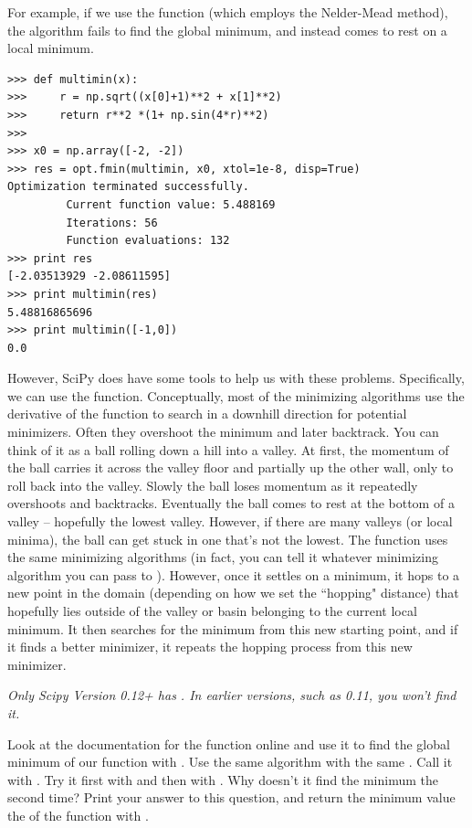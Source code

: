 For example, if we use the  function (which employs the Nelder-Mead method), the algorithm fails to find the global minimum, and instead comes to rest on a local minimum.
\begin{lstlisting}
>>> def multimin(x):
>>>     r = np.sqrt((x[0]+1)**2 + x[1]**2)
>>>     return r**2 *(1+ np.sin(4*r)**2)
>>>
>>> x0 = np.array([-2, -2])
>>> res = opt.fmin(multimin, x0, xtol=1e-8, disp=True)
Optimization terminated successfully.
         Current function value: 5.488169
         Iterations: 56
         Function evaluations: 132
>>> print res
[-2.03513929 -2.08611595]
>>> print multimin(res)
5.48816865696
>>> print multimin([-1,0])
0.0
\end{lstlisting}

However, SciPy does have some tools to help us with these problems. Specifically, we can use the  function.
Conceptually, most of the minimizing algorithms use the derivative of the function to search in a downhill direction for potential minimizers.
Often they overshoot the minimum and later backtrack. You can think of it as a ball rolling down a hill into a valley.
At first, the momentum of the ball carries it across the valley floor and partially up the other wall, only to roll back into the valley.
Slowly the ball loses momentum as it repeatedly overshoots and backtracks. Eventually the ball comes to rest at the bottom of a valley -- hopefully the lowest valley.
However, if there are many valleys (or local minima), the ball can get stuck in one that's not the lowest.
The  function uses the same minimizing algorithms (in fact, you can tell it whatever minimizing algorithm you can pass to ).
However, once it settles on a minimum, it hops to a new point in the domain (depending on how we set the ``hopping" distance) that hopefully lies outside of the valley
or basin belonging to the current local minimum.
It then searches for the minimum from this new starting point, and if it finds a better minimizer, it repeats the hopping process from this new minimizer.

\emph{Only Scipy Version 0.12+ has . In earlier versions, such as 0.11, you won't find it.}
\begin{problem}

Look at the documentation for the  function online and use it to find the global minimum of our  function with .
Use the same  algorithm with the same . Call it with .
Try it first with  and then with . Why doesn't it find the minimum the second time? Print your answer to this question, and
return the minimum value the of the function with .

\end{problem}


